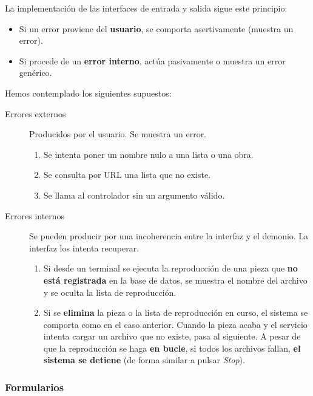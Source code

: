 La implementación de las interfaces de entrada y salida sigue este principio:

\begin{itemize}
	\item Si un error proviene del \textbf{usuario}, se comporta asertivamente (muestra un error).
	\item Si procede de un \textbf{error interno}, actúa pasivamente o muestra un error genérico.
\end{itemize}

Hemos contemplado los siguientes supuestos:

\begin{description}
	\item[Errores externos] Producidos por el usuario. Se muestra un error.
	
	\begin{enumerate}
		\item Se intenta poner un nombre nulo a una lista o una obra.
		\item Se consulta por \acrshort{URL} una lista que no existe.
		\item Se llama al controlador sin un argumento válido.
	\end{enumerate}
	
	\item[Errores internos] Se pueden producir por una incoherencia entre la interfaz y el demonio. La interfaz los intenta recuperar.
	
	\begin{enumerate}
		\item Si desde un terminal se ejecuta la reproducción de una pieza que \textbf{no está registrada} en la base de datos, se muestra el nombre del archivo y se oculta la lista de reproducción.
		
		\item Si se \textbf{elimina} la pieza o la lista de reproducción en curso, el sistema se comporta como en el caso anterior. Cuando la pieza acaba y el servicio intenta cargar un archivo que no existe, pasa al siguiente. A pesar de que la reproducción se haga \textbf{en bucle}, si todos los archivos fallan, \textbf{el sistema se detiene} (de forma similar a pulsar \textit{Stop}).
	\end{enumerate}
\end{description}

\subsubsection{Formularios}

